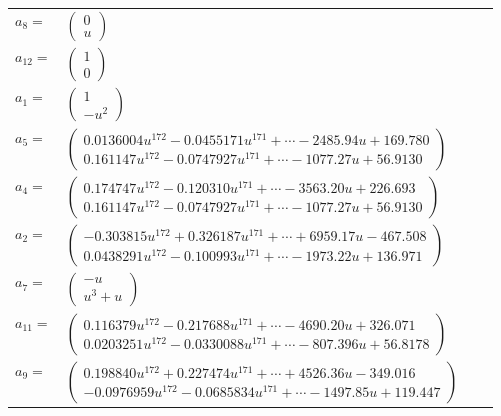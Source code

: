 \documentclass[1p]{elsarticle_modified}
\theoremstyle{definition}
\begin{document}
\begin{tabular}{m{7pt} m{180pt} m{7pt} m{180pt} }
\flushright $a_{8}=$&$\begin{pmatrix}0\\u\end{pmatrix}$ \\
\flushright $a_{12}=$&$\begin{pmatrix}1\\0\end{pmatrix}$ \\
\flushright $a_{1}=$&$\begin{pmatrix}1\\- u^2\end{pmatrix}$ \\
\flushright $a_{5}=$&$\begin{pmatrix}0.0136004 u^{172}-0.0455171 u^{171}+\cdots-2485.94 u+169.780\\0.161147 u^{172}-0.0747927 u^{171}+\cdots-1077.27 u+56.9130\end{pmatrix}$ \\
\flushright $a_{4}=$&$\begin{pmatrix}0.174747 u^{172}-0.120310 u^{171}+\cdots-3563.20 u+226.693\\0.161147 u^{172}-0.0747927 u^{171}+\cdots-1077.27 u+56.9130\end{pmatrix}$ \\
\flushright $a_{2}=$&$\begin{pmatrix}-0.303815 u^{172}+0.326187 u^{171}+\cdots+6959.17 u-467.508\\0.0438291 u^{172}-0.100993 u^{171}+\cdots-1973.22 u+136.971\end{pmatrix}$ \\
\flushright $a_{7}=$&$\begin{pmatrix}- u\\u^3+u\end{pmatrix}$ \\
\flushright $a_{11}=$&$\begin{pmatrix}0.116379 u^{172}-0.217688 u^{171}+\cdots-4690.20 u+326.071\\0.0203251 u^{172}-0.0330088 u^{171}+\cdots-807.396 u+56.8178\end{pmatrix}$ \\
\flushright $a_{9}=$&$\begin{pmatrix}0.198840 u^{172}+0.227474 u^{171}+\cdots+4526.36 u-349.016\\-0.0976959 u^{172}-0.0685834 u^{171}+\cdots-1497.85 u+119.447\end{pmatrix}$ \\

\end{tabular}
\end{document}
